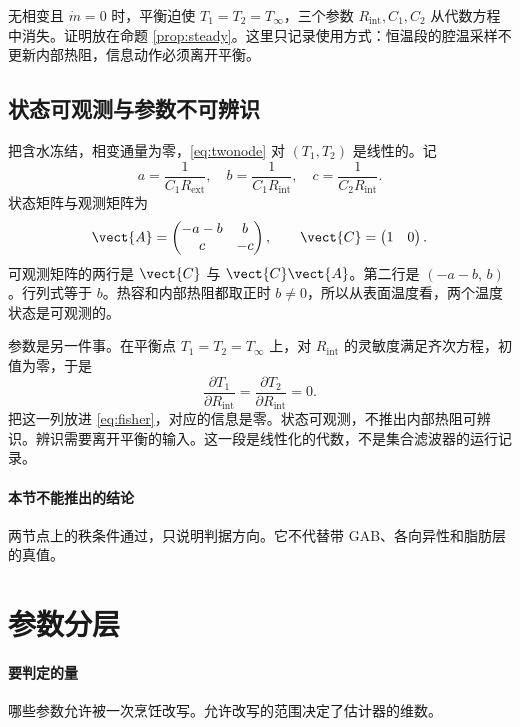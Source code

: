 无相变且 \(\dot m=0\) 时，平衡迫使 \(T_1=T_2=T_\infty\)，三个参数 \(R_{\mathrm{int}},C_1,C_2\) 从代数方程中消失。证明放在命题 \ref{prop:steady}。这里只记录使用方式：恒温段的腔温采样不更新内部热阻，信息动作必须离开平衡。

\subsection{状态可观测与参数不可辨识}

把含水冻结，相变通量为零，\eqref{eq:twonode} 对 \((T_1,T_2)\) 是线性的。记
\[
a=\frac{1}{C_1 R_{\mathrm{ext}}},\quad
b=\frac{1}{C_1 R_{\mathrm{int}}},\quad
c=\frac{1}{C_2 R_{\mathrm{int}}}.
\]
状态矩阵与观测矩阵为
\begin{equation}
\label{eq:fv-obsv}
\vect{A}=\begin{pmatrix}-a-b & b\\ c & -c\end{pmatrix},\qquad
\vect{C}=\begin{pmatrix}1 & 0\end{pmatrix}.
\end{equation}
可观测矩阵的两行是 \(\vect{C}\) 与 \(\vect{C}\vect{A}\)。第二行是 \((-a-b,\, b)\)。行列式等于 \(b\)。热容和内部热阻都取正时 \(b\neq 0\)，所以从表面温度看，两个温度状态是可观测的。

参数是另一件事。在平衡点 \(T_1=T_2=T_\infty\) 上，对 \(R_{\mathrm{int}}\) 的灵敏度满足齐次方程，初值为零，于是
\begin{equation}
\label{eq:fv-fisher0}
\frac{\partial T_1}{\partial R_{\mathrm{int}}}=\frac{\partial T_2}{\partial R_{\mathrm{int}}}=0.
\end{equation}
把这一列放进 \eqref{eq:fisher}，对应的信息是零。状态可观测，不推出内部热阻可辨识。辨识需要离开平衡的输入。这一段是线性化的代数，不是集合滤波器的运行记录。

\paragraph{本节不能推出的结论}
两节点上的秩条件通过，只说明判据方向。它不代替带 GAB、各向异性和脂肪层的真值。

\section{参数分层}

\paragraph{要判定的量}
哪些参数允许被一次烹饪改写。允许改写的范围决定了估计器的维数。

